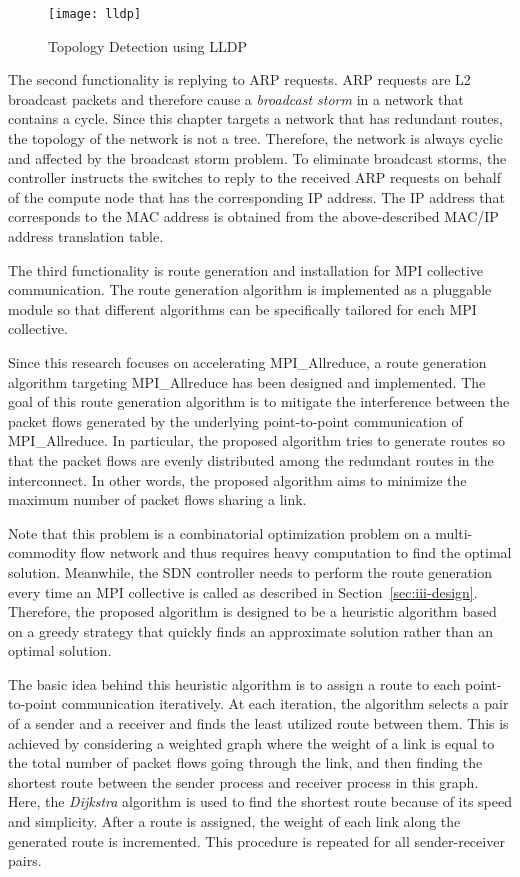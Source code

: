 \begin{figure}
    \centering
    \texttt{[image: lldp]}
    \caption{Topology Detection using LLDP}%
    \label{fig:lldp}
\end{figure}

The second functionality is replying to ARP requests. ARP requests are L2
broadcast packets and therefore cause a \emph{broadcast storm} in a network
that contains a cycle. Since this chapter targets a network that has redundant
routes, the topology of the network is not a tree. Therefore, the network is
always cyclic and affected by the broadcast storm problem. To eliminate
broadcast storms, the controller instructs the switches to reply to the
received ARP requests on behalf of the compute node that has the corresponding
IP address. The IP address that corresponds to the MAC address is obtained
from the above-described MAC/IP address translation table.

The third functionality is route generation and installation for MPI
collective communication. The route generation algorithm is implemented as a
pluggable module so that different algorithms can be specifically tailored for
each MPI collective.

Since this research focuses on accelerating MPI\_Allreduce, a route generation
algorithm targeting MPI\_Allreduce has been designed and implemented. The goal
of this route generation algorithm is to mitigate the interference between the
packet flows generated by the underlying point-to-point communication of
MPI\_Allreduce. In particular, the proposed algorithm tries to generate routes
so that the packet flows are evenly distributed among the redundant routes in
the interconnect. In other words, the proposed algorithm aims to minimize the
maximum number of packet flows sharing a link.

Note that this problem is a combinatorial optimization problem on a
multi-commodity flow network and thus requires heavy computation to find the
optimal solution. Meanwhile, the SDN controller needs to perform the route
generation every time an MPI collective is called as described in
Section~\ref{sec:iii-design}. Therefore, the proposed algorithm is designed to
be a heuristic algorithm based on a greedy strategy that quickly finds an
approximate solution rather than an optimal solution.

The basic idea behind this heuristic algorithm is to assign a route to each
point-to-point communication iteratively. At each iteration, the algorithm
selects a pair of a sender and a receiver and finds the least utilized route
between them. This is achieved by considering a weighted graph where the
weight of a link is equal to the total number of packet flows going through
the link, and then finding the shortest route between the sender process and
receiver process in this graph. Here, the \emph{Dijkstra} algorithm is used to
find the shortest route because of its speed and simplicity. After a route is
assigned, the weight of each link along the generated route is incremented.
This procedure is repeated for all sender-receiver pairs.

